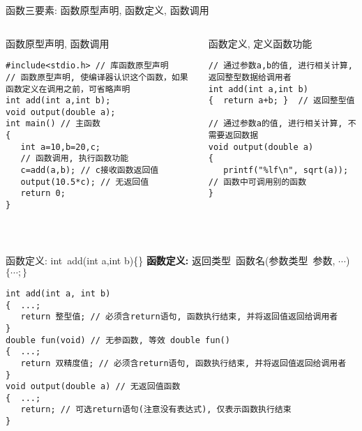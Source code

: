 \begin{frame}{函数三要素: 函数原型声明, 函数定义, 函数调用}
\vspace{-0.2cm}
\begin{columns}[T]
\begin{beamerboxesrounded}{函数原型声明, 函数调用}
\begin{lstlisting}
#include<stdio.h> // 库函数原型声明
// 函数原型声明, 使编译器认识这个函数，如果函数定义在调用之前，可省略声明
int add(int a,int b); 
void output(double a);
int main() // 主函数
{
   int a=10,b=20,c;
   // 函数调用, 执行函数功能
   c=add(a,b); // c接收函数返回值
   output(10.5*c); // 无返回值
   return 0; 
}
\end{lstlisting}
\end{beamerboxesrounded}
\begin{beamerboxesrounded}{函数定义, 定义函数功能}
\begin{lstlisting}
// 通过参数a,b的值, 进行相关计算, 返回整型数据给调用者
int add(int a,int b)
{  return a+b; }  // 返回整型值

// 通过参数a的值, 进行相关计算, 不需要返回数据
void output(double a)
{  
   printf("%lf\n", sqrt(a)); // 函数中可调用别的函数
}
\end{lstlisting}
\end{beamerboxesrounded}
\end{columns}
~\\
\end{frame}


\begin{frame}{函数定义: int\, add(int a,int b)\{\quad\}}
\textbf{函数定义: } 返回类型\, 函数名(参数类型\, 参数, $\cdots$) $\{\cdots ; \}$
\begin{lstlisting}
int add(int a, int b)
{  ...;
   return 整型值; // 必须含return语句, 函数执行结束, 并将返回值返回给调用者
}
double fun(void) // 无参函数, 等效 double fun() 
{  ...;
   return 双精度值; // 必须含return语句, 函数执行结束, 并将返回值返回给调用者
}
void output(double a) // 无返回值函数
{  ...;
   return; // 可选return语句(注意没有表达式), 仅表示函数执行结束
}
\end{lstlisting}
\end{frame}

